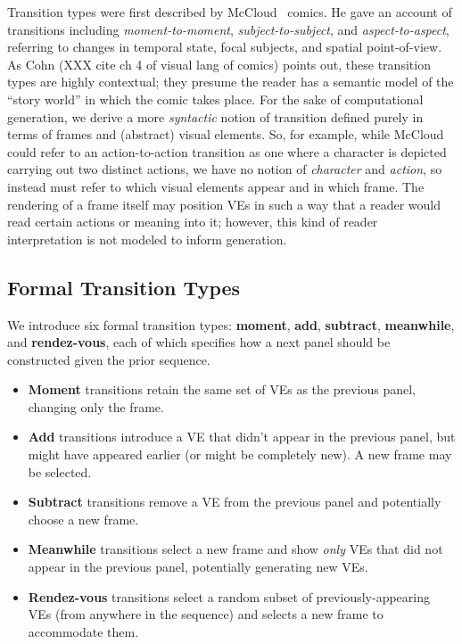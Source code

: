 Transition types were first described by
McCloud~\cite{mcCloud1993understanding} %
comics. He gave an account of transitions including {\em moment-to-moment},
{\em subject-to-subject}, and {\em aspect-to-aspect}, referring to changes
in temporal state, focal subjects, and spatial point-of-view. As Cohn (XXX
cite ch 4 of visual lang of comics) points out, these transition types are
highly contextual; they presume the reader has a semantic model of the
``story world'' in which the comic takes place. For the sake of
computational generation, we derive a more {\em syntactic} notion of
transition defined purely in terms of frames and (abstract) visual
elements. So, for example, while McCloud could refer to an action-to-action
transition as one where a character is depicted carrying out two distinct
actions, we have no notion of {\em character} and {\em action}, so instead
must refer to which visual elements appear and in which frame. The
rendering of a frame itself may position VEs in such a way that a reader
would read certain actions or meaning into it; however, this kind of reader
interpretation is not modeled to inform generation.

\subsection{Formal Transition Types}

We introduce six formal transition types: {\bf moment}, {\bf add}, {\bf
subtract}, {\bf meanwhile}, and {\bf rendez-vous}, each of which specifies
how a next panel should be constructed given the prior sequence.

\begin{itemize}
\item {\bf Moment} transitions retain the same set of VEs as the previous panel, 
changing only the frame.

\item {\bf Add} transitions introduce a VE that didn't appear in the
previous panel, but might have appeared earlier (or might be completely
new). A new frame may be selected.

\item {\bf Subtract} transitions remove a VE from the previous panel and
potentially choose a new frame.

\item {\bf Meanwhile} transitions select a new frame and show {\em only}
VEs that did not appear in the previous panel, potentially generating new
VEs.

\item {\bf Rendez-vous} transitions select a random subset of
previously-appearing VEs (from anywhere in the sequence) and selects a new
frame to accommodate them.
\end{itemize}

